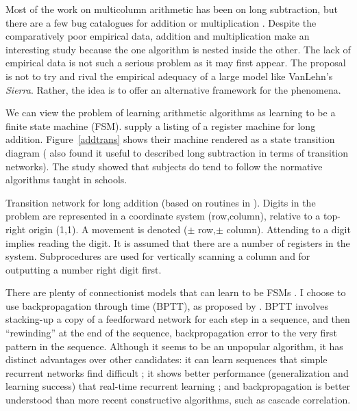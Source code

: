 Most of the work on multicolumn
arithmetic has been on long subtraction, but there
are a few bug catalogues for addition or multiplication
\cite{attimicr,nicodesi,shar}.
Despite the
comparatively poor empirical data,  addition and multiplication make an
interesting study because the one algorithm is nested inside the other. The
lack of empirical data is not such a serious problem as it may first
appear.  The proposal is not to try and rival the empirical adequacy of a
large model like VanLehn's {\em Sierra}.  Rather, the idea is to offer an
alternative framework for the phenomena.


We can view the problem of learning arithmetic algorithms as
learning to be a finite state machine (FSM).
 supply a listing of a register machine for long addition.
Figure~\ref{addtrans} shows their machine rendered as a state transition
diagram (
also found it useful to described long subtraction
in terms of transition networks). The  study showed that
subjects do tend to follow the normative algorithms taught in schools.

\begin{fancyfigure}
\centerline{}
\caption{Transition network for long addition (based on routines in
\protect{}).  Digits in the problem are represented in a
coordinate system (row,column), relative to a top-right origin (1,1).
A movement is denoted ($\pm$ row,$\pm$ column).
Attending to a digit implies reading the
digit. It is assumed that there are a number of registers in the
system. Subprocedures are used for
vertically scanning a column and for outputting
a number right digit first.}
\label{addtrans}
\end{fancyfigure}

There are plenty of connectionist models that can learn to be FSMs
\cite{pdp:8,elmafind,servenco,cottlear,clues,willexpe,rcascor}. I
choose to use backpropagation through time (BPTT), as proposed by
.  BPTT involves stacking-up a copy of a
feedforward network for each step in a sequence, and then ``rewinding'' at
the end of the sequence,
backpropagation error to the very first pattern in the sequence.
Although it seems to be an unpopular algorithm, it has distinct advantages
over other candidates: it can learn sequences that
simple recurrent networks
find difficult \cite{maskforc}; it shows better performance (generalization
and learning success) that real-time recurrent learning \cite{zipssubg};
and backpropagation is better understood than more recent constructive
algorithms, such as cascade correlation.

